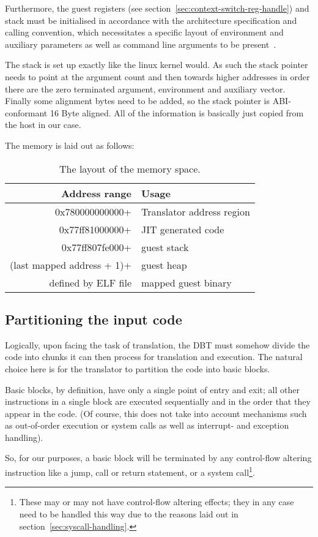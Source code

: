 Furthermore, the guest registers (see section~\vref{sec:context-switch-reg-handle}) and stack must be initialised in accordance with the architecture specification and calling convention, which necessitates a specific layout of environment and auxiliary parameters as well as command line arguments to be present~\cite[S. 2]{bintrans}.

The stack is set up exactly like the linux kernel would.
As such the stack pointer needs to point at the argument count and then towards higher addresses in order there are the zero terminated argument, environment and auxiliary vector.
Finally some alignment bytes need to be added, so the stack pointer is ABI-conformant 16 Byte aligned.
All of the information is basically just copied from the host in our case.

The memory is laid out as follows:
\begin{table}[h]
	\centering
	\begin{tabular}{rl}
		\toprule
		\textbf{Address range} & \textbf{Usage}\\
		\midrule
		0x780000000000+ & Translator address region\\
		0x77ff81000000+ & JIT generated code\\
		0x77ff807fe000+ & guest stack\\
		(last mapped address + 1)+ & guest heap\\
		defined by ELF file & mapped guest binary\\
		\bottomrule
	\end{tabular}
	\caption[Memory layout]%
	{The layout of the memory space.}
	\label{tab:}
\end{table}


\subsection{Partitioning the input code}
Logically, upon facing the task of translation, the DBT must somehow divide the code into chunks it can then process for translation and execution.
The natural choice here is for the translator to partition the code into basic blocks.

Basic blocks, by definition, have only a single point of entry and exit;
all other instructions in a single block are executed sequentially and in the order that they appear in the code.
(Of course, this does not take into account mechanisms such as out-of-order execution or system calls as well as interrupt- and exception handling).

So, for our purposes, a basic block will be terminated by any control-flow altering instruction like a jump, call or return statement, or a system call\footnote{These may or may not have control-flow altering effects; they in any case need to be handled this way due to the reasons laid out in section~\ref{sec:syscall-handling}.}.








